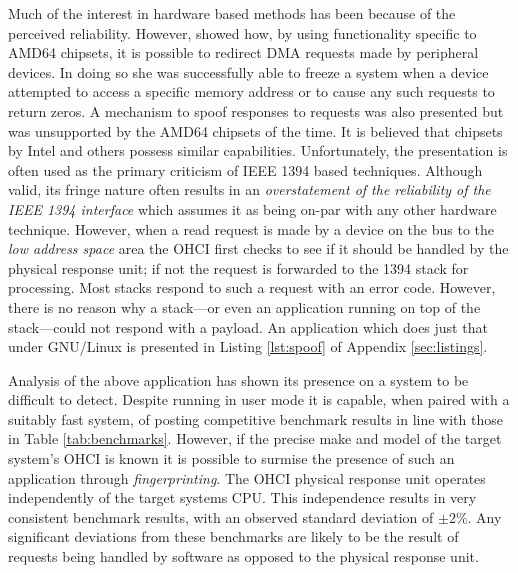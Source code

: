 \documentclass[numbers=noenddot,      %
               abstract,              %
               captions=tableheading, %
               DIV=8]                 %
              {scrartcl}
\begin{document}
Much of the interest in hardware based methods has been because of the
perceived reliability. However, \cite{rutkowska07} showed how, by using
functionality specific to AMD64 chipsets, it is possible to redirect DMA
requests made by peripheral devices. In doing so she was successfully
able to freeze a system when a device attempted to access a specific
memory address or to cause any such requests to return zeros. A
mechanism to spoof responses to requests was also presented but was
unsupported by the AMD64 chipsets of the time. It is believed that
chipsets by Intel and others possess similar
capabilities. Unfortunately, the presentation is often used as the
primary criticism of IEEE 1394 based techniques. Although valid, its
fringe nature often results in an \emph{overstatement of the reliability
  of the IEEE 1394 interface} which assumes it as being on-par with any
other hardware technique. However, when a read request is made by a
device on the bus to the \emph{low address space} area the OHCI first
checks to see if it should be handled by the physical response unit; if
not the request is forwarded to the 1394 stack for processing. Most
stacks respond to such a request with an error code. However, there is
no reason why a stack---or even an application running on top of the
stack---could not respond with a payload. An application which does just
that under GNU/Linux is presented in Listing \ref{lst:spoof} of Appendix
\ref{sec:listings}.

Analysis of the above application has shown its presence on a system to
be difficult to detect. Despite running in user mode it is capable, when
paired with a suitably fast system, of posting competitive benchmark
results in line with those in Table \ref{tab:benchmarks}. However, if
the precise make and model of the target system's OHCI is known it is
possible to surmise the presence of such an application through
\emph{fingerprinting}. The OHCI physical response unit operates
independently of the target systems CPU. This independence results in
very consistent benchmark results, with an observed standard deviation
of $\pm 2\%$. Any significant deviations from these benchmarks are
likely to be the result of requests being handled by software as opposed
to the physical response unit.
\end{document}
